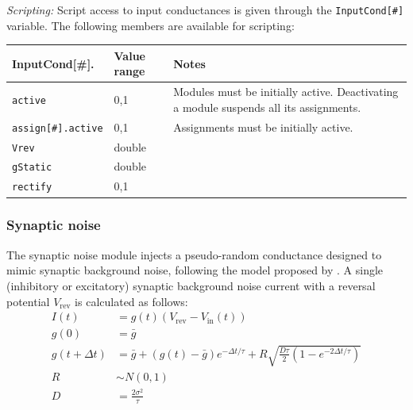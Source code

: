 \documentclass{article}
\begin{document}
\noindent
\emph{Scripting:} Script access to input conductances is given through the \texttt{InputCond[\#]} variable.
The following members are available for scripting: \\
\begin{tabularx}{\linewidth}{|ll|X|}
\hline
{\bf InputCond[\#].\textvisiblespace} & {\bf Value range} & {\bf Notes} \\
\hline
\texttt{active} & 0,1 & Modules must be initially active. Deactivating a module suspends all
its assignments. \\
\texttt{assign[\#].active} & 0,1 & Assignments must be initially active. \\
\texttt{Vrev} & double &\\
\texttt{gStatic} & double &\\
\texttt{rectify} & 0,1 &\\
\hline
\end{tabularx}

\subsubsection{Synaptic noise}
The synaptic noise module injects a pseudo-random conductance designed to mimic synaptic background noise,
following the model proposed by \cite{destexhe2001fluctuating}. A single (inhibitory or excitatory)
synaptic background noise current with a reversal potential $V_{\text{rev}}$ is calculated as follows:
\begin{align}
I(t) &= g(t) (V_{\text{rev}} - V_{\text{in}}(t)) \\
g(0) &= \bar{g} \\
g(t + \Delta t) &= \bar{g} + (g(t) - \bar{g}) e^{-\Delta t/\tau}
 + R \sqrt{\frac{D\tau}{2}(1 - e^{-2\Delta t/\tau})} \\
R &\sim N(0,1) \\
D &= \frac{2\sigma^2}{\tau}
\end{align}
\end{document}
